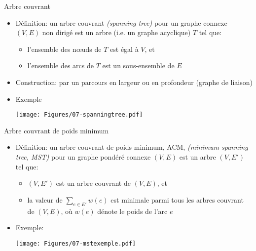 \begin{frame}{Arbre couvrant}

\begin{itemize}
\item Définition: un \alert{arbre couvrant} {\it (spanning tree)}
  pour un graphe connexe $(V,E)$ non dirigé est un arbre (i.e. un
  graphe acyclique) $T$ tel que:
\begin{itemize}
\item l'ensemble des n\oe uds de $T$ est égal à $V$, et
\item l'ensemble des arcs de $T$ est un sous-ensemble de $E$
\end{itemize}
\item Construction: par un parcours en largeur ou en profondeur (graphe de liaison)
\item Exemple

\bigskip

\centerline{\texttt{[image: Figures/07-spanningtree.pdf]}}

\end{itemize}

\end{frame}

\begin{frame}{Arbre couvrant de poids minimum}
\begin{itemize}
\item Définition: un \alert{arbre couvrant de poids minimum}, ACM, {\it (minimum
  spanning tree, MST)} pour un graphe pondéré connexe $(V,E)$ est un arbre $(V,E')$ tel que:
\begin{itemize}
\item $(V,E')$ est un arbre couvrant de $(V,E)$, et
\item la valeur de $\sum_{e\in E'} w(e)$ est minimale parmi tous les
  arbres couvrant de $(V,E)$, où $w(e)$ dénote le poids de l'arc $e$
\end{itemize}

\bigskip

\item Exemple:
\centerline{\texttt{[image: Figures/07-mstexemple.pdf]}}
\end{itemize}

\end{frame}

